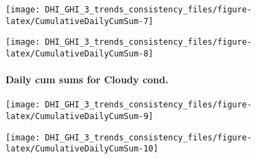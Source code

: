 \documentclass[
  10pt,
  a4paper,oneside]{article}
\begin{document}
\normalsize

\begin{center}\texttt{[image: DHI\_GHI\_3\_trends\_consistency\_files/figure-latex/CumulativeDailyCumSum-7]} \end{center}

\begin{center}\texttt{[image: DHI\_GHI\_3\_trends\_consistency\_files/figure-latex/CumulativeDailyCumSum-8]} \end{center}

\newpage

\hypertarget{daily-cum-sums-for-cloudy-cond.}{%
\paragraph{Daily cum sums for Cloudy cond.}\label{daily-cum-sums-for-cloudy-cond.}}

\begin{center}\texttt{[image: DHI\_GHI\_3\_trends\_consistency\_files/figure-latex/CumulativeDailyCumSum-9]} \end{center}

\begin{center}\texttt{[image: DHI\_GHI\_3\_trends\_consistency\_files/figure-latex/CumulativeDailyCumSum-10]} \end{center}

\newpage

\footnotesize
\end{document}
